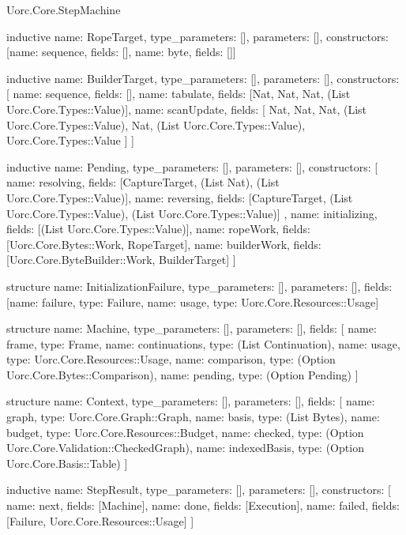 \begin{lexlean}{Uorc.Core.StepMachine}
\begin{semanticmodule}
inductive{
  name: RopeTarget,
  type_parameters: [],
  parameters: [],
  constructors: [{name: sequence, fields: []}, {name: byte, fields: []}]
}

inductive{
  name: BuilderTarget,
  type_parameters: [],
  parameters: [],
  constructors: [
    {name: sequence, fields: []},
    {name: tabulate, fields: [Nat, Nat, Nat, (List Uorc.Core.Types::Value)]},
    {
      name: scanUpdate,
      fields: [
        Nat,
        Nat,
        Nat,
        (List Uorc.Core.Types::Value),
        Nat,
        (List Uorc.Core.Types::Value),
        Uorc.Core.Types::Value
      ]
    }
  ]
}

inductive{
  name: Pending,
  type_parameters: [],
  parameters: [],
  constructors: [
    {name: resolving, fields: [CaptureTarget, (List Nat), (List Uorc.Core.Types::Value)]},
    {
      name: reversing,
      fields: [CaptureTarget, (List Uorc.Core.Types::Value), (List Uorc.Core.Types::Value)]
    },
    {name: initializing, fields: [(List Uorc.Core.Types::Value)]},
    {name: ropeWork, fields: [Uorc.Core.Bytes::Work, RopeTarget]},
    {name: builderWork, fields: [Uorc.Core.ByteBuilder::Work, BuilderTarget]}
  ]
}

structure{
  name: InitializationFailure,
  type_parameters: [],
  parameters: [],
  fields: [{name: failure, type: Failure}, {name: usage, type: Uorc.Core.Resources::Usage}]
}

structure{
  name: Machine,
  type_parameters: [],
  parameters: [],
  fields: [
    {name: frame, type: Frame},
    {name: continuations, type: (List Continuation)},
    {name: usage, type: Uorc.Core.Resources::Usage},
    {name: comparison, type: (Option Uorc.Core.Bytes::Comparison)},
    {name: pending, type: (Option Pending)}
  ]
}

structure{
  name: Context,
  type_parameters: [],
  parameters: [],
  fields: [
    {name: graph, type: Uorc.Core.Graph::Graph},
    {name: basis, type: (List Bytes)},
    {name: budget, type: Uorc.Core.Resources::Budget},
    {name: checked, type: (Option Uorc.Core.Validation::CheckedGraph)},
    {name: indexedBasis, type: (Option Uorc.Core.Basis::Table)}
  ]
}

inductive{
  name: StepResult,
  type_parameters: [],
  parameters: [],
  constructors: [
    {name: next, fields: [Machine]},
    {name: done, fields: [Execution]},
    {name: failed, fields: [Failure, Uorc.Core.Resources::Usage]}
  ]
}


\end{semanticmodule}
\end{lexlean}
